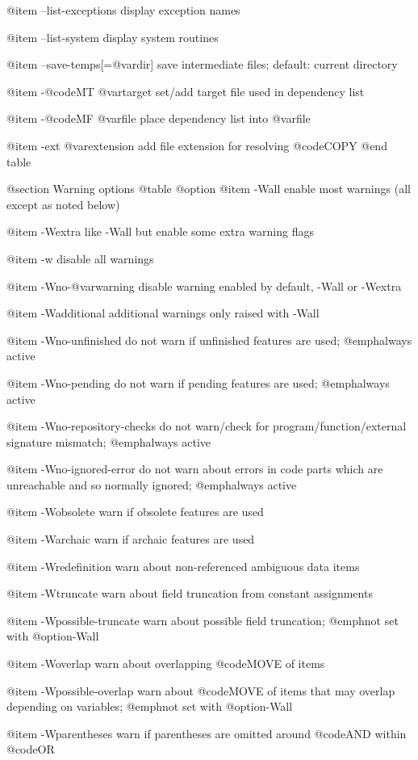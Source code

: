 @item --list-exceptions
display exception names

@item --list-system
display system routines

@item --save-temps[=@var{dir}]
save intermediate files; default: current directory

@item -@code{MT} @var{target}
set/add target file used in dependency list

@item -@code{MF} @var{file}
place dependency list into @var{file}

@item -ext @var{extension}
add file extension for resolving @code{COPY}
@end table

@section Warning options
@table @option
@item -Wall
enable most warnings (all except as noted below)

@item -Wextra
like -Wall but enable some extra warning flags

@item -w
disable all warnings

@item -Wno-@var{warning}
disable warning enabled by default, -Wall or -Wextra

@item -Wadditional
additional warnings only raised with -Wall

@item -Wno-unfinished
do not warn if unfinished features are used; @emph{always} active

@item -Wno-pending
do not warn if pending features are used; @emph{always} active

@item -Wno-repository-checks
do not warn/check for program/function/external signature mismatch; @emph{always} active

@item -Wno-ignored-error
do not warn about errors in code parts which are unreachable and so normally ignored; @emph{always} active

@item -Wobsolete
warn if obsolete features are used

@item -Warchaic
warn if archaic features are used

@item -Wredefinition
warn about non-referenced ambiguous data items

@item -Wtruncate
warn about field truncation from constant assignments

@item -Wpossible-truncate
warn about possible field truncation; @emph{not} set with @option{-Wall}

@item -Woverlap
warn about overlapping @code{MOVE} of items

@item -Wpossible-overlap
warn about @code{MOVE} of items that may overlap depending on variables; @emph{not} set with @option{-Wall}

@item -Wparentheses
warn if parentheses are omitted around @code{AND} within @code{OR}

